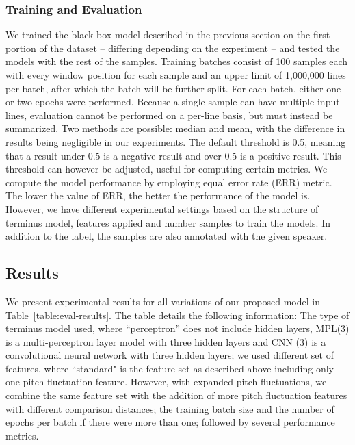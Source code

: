 \documentclass{article}
\begin{document}
\subsubsection{Training and Evaluation}
We trained the black-box model described in the previous section on the first portion of the dataset -- differing depending on the experiment -- and tested the models with the rest of the samples. Training batches consist of 100 samples each with every window position for each sample and an upper limit of 1,000,000 lines per batch, after which the batch will be further split. For each batch, either one or two epochs were performed. Because a single sample can have multiple input lines, evaluation cannot be performed on a per-line basis, but must instead be summarized. Two methods are possible: median and mean, with the difference in results being negligible in our experiments. The default threshold is 0.5, meaning that a result under 0.5 is a negative result and over 0.5 is a positive result. This threshold can however be adjusted, useful for computing certain metrics. We compute the model performance by employing equal error rate (ERR) metric. The lower the value of ERR, the better the performance of the model is. However, we have different experimental settings based on the structure of terminus model, features applied and number samples to train the models. In addition to the label, the samples are also annotated with the given speaker.

\subsection{Results}
We present experimental results for all variations of our proposed model in Table~\ref{table:eval-results}. The table details the following information: The type of terminus model used, where ``perceptron'' does not include hidden layers, MPL(3) is a multi-perceptron layer model with three hidden layers and CNN (3) is a convolutional neural network with three hidden layers; we used different set of features, where ``standard" is the feature set as described above including only one pitch-fluctuation feature. However, with expanded pitch fluctuations, we combine the same feature set with the addition of more pitch fluctuation features with different comparison distances; the training batch size and the number of epochs per batch if there were more than one; followed by several performance metrics. 
\end{document}
